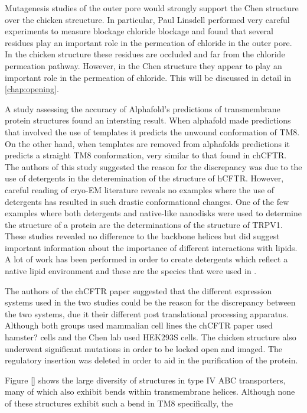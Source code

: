 Mutagenesis studies of the outer pore would strongly support the Chen structure over the chicken streucture. In particular, Paul Linsdell performed very careful experiments to measure blockage chloride blockage and found that several residues play an important role in the permeation of chloride in the outer pore. In the chicken structure these residues are occluded and far from the chloride permeation pathway. However, in the Chen structure they appear to play an important role in the permeation of chloride. This will be discussed in detail in \ref{chap:opening}.

A study assessing the accuracy of Alphafold's predictions of transmembrane protein structures found an intersting result. When alphafold made predictions that involved the use of templates it predicts the unwound conformation of TM8. On the other hand, when templates are removed from alphafolds predictions it predicts a straight TM8 conformation, very similar to that found in chCFTR. The authors of this study suggested the reason for the discrepancy was due to the use of detergents in the deteremination of the structure of hCFTR. However, careful reading of cryo-EM literature reveals no examples where the use of detergents has resulted in such drastic conformational changes. One of the few examples where both detergents and native-like nanodisks were used to determine the structure of a protein are the determinations of the structure of TRPV1. These studies revealed no difference to the backbone helices but did suggest important information about the importance of different interactions with lipids. A lot of work has been performed in order to create detergents which reflect a native lipid environment and these are the species that were used in . 

The authors of the chCFTR paper suggested that the different expression systems used in the two studies could be the reason for the discrepancy between the two systems, due it their different post translational processing apparatus. Although both groups used mammalian cell lines the chCFTR paper used hamster? cells \cite{aleksandrov2015} and the Chen lab used HEK293S cells. The chicken structure also underwent significant mutations in order to be locked open and imaged. The regulatory insertion was deleted in order to aid in the purification of the protein. 

Figure \ref{} shows the large diversity of structures in type IV ABC transporters, many of which also exhibit bends within transmembrane helices\cite{thomas2020}. Although none of these structures exhibit such a bend in TM8 specifically, the 

